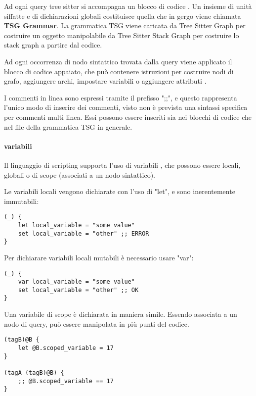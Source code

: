 Ad ogni query tree sitter si accompagna un blocco di codice \cite{TreeSitterGraphReferenceHighLevelStructure}.
Un insieme di unit\`a siffatte e di dichiarazioni globali costituisce quella che in gergo viene chiamata \textbf{TSG Grammar}.
La grammatica TSG viene caricata da Tree Sitter Graph per costruire un oggetto manipolabile da Tree Sitter Stack Graph per costruire lo stack graph a partire dal codice.

Ad ogni occorrenza di nodo sintattico trovata dalla query viene applicato il blocco di codice appaiato, che pu\`o contenere istruzioni per costruire nodi di grafo, aggiungere archi, impostare variabili o aggiungere attributi \cite{TreeSitterGraphReferenceTerminology}.

I commenti in linea sono espressi tramite il prefisso ";;", e questo rappresenta l'unico modo di inserire dei commenti, visto non \`e prevista una sintassi specifica per commenti multi linea.
Essi possono essere inseriti sia nei blocchi di codice che nel file della grammatica TSG in generale.

\paragraph{variabili}
Il linguaggio di scripting supporta l'uso di variabili \cite{TreeSitterGraphReferenceVariables}, che possono essere locali, globali o di scope (associati a un nodo sintattico).

Le variabili locali vengono dichiarate con l'uso di "let", e sono inerentemente immutabili:

\begin{lstlisting}
(_) {
    let local_variable = "some value"
    set local_variable = "other" ;; ERROR
}
\end{lstlisting}

Per dichiarare variabili locali mutabili \`e necessario usare "var":

\begin{lstlisting}
(_) {
    var local_variable = "some value"
    set local_variable = "other" ;; OK
}
\end{lstlisting}

Una variabile di scope \`e dichiarata in maniera simile. Essendo associata a un nodo di query, pu\`o essere manipolata in pi\`u punti del codice.

\begin{lstlisting}
(tagB)@B {
    let @B.scoped_variable = 17
}

(tagA (tagB)@B) {
    ;; @B.scoped_variable == 17
}
\end{lstlisting}

